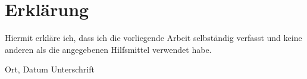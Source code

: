 \section*{Erklärung}

Hiermit erkläre ich, dass ich die vorliegende Arbeit selbständig verfasst und keine anderen als die angegebenen Hilfsmittel verwendet habe.

\vspace{2cm}

\noindent
Ort, Datum \hfill Unterschrift
